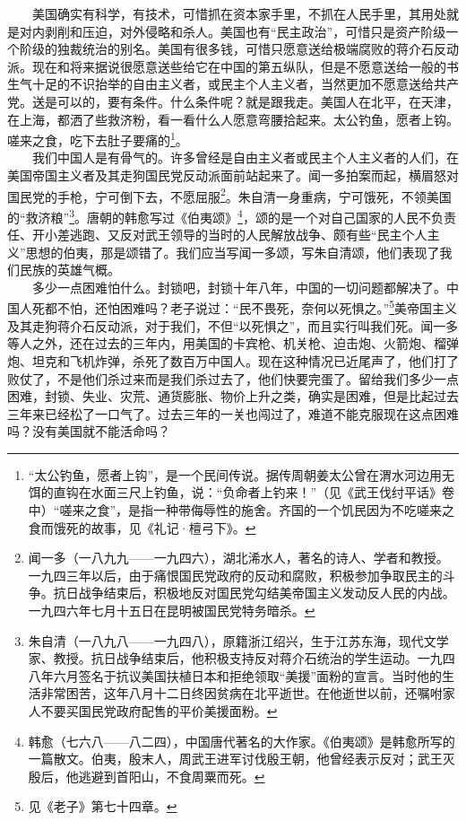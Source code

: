 \documentclass[cn,11pt,chinese]{elegantbook}
\begin{document}
　　美国确实有科学，有技术，可惜抓在资本家手里，不抓在人民手里，其用处就是对内剥削和压迫，对外侵略和杀人。美国也有“民主政治”，可惜只是资产阶级一个阶级的独裁统治的别名。美国有很多钱，可惜只愿意送给极端腐败的蒋介石反动派。现在和将来据说很愿意送些给它在中国的第五纵队，但是不愿意送给一般的书生气十足的不识抬举的自由主义者，或民主个人主义者，当然更加不愿意送给共产党。送是可以的，要有条件。什么条件呢？就是跟我走。美国人在北平，在天津，在上海，都洒了些救济粉，看一看什么人愿意弯腰拾起来。太公钓鱼，愿者上钩。嗟来之食，吃下去肚子要痛的\footnote[6]{ “太公钓鱼，愿者上钩”，是一个民间传说。据传周朝姜太公曾在渭水河边用无饵的直钩在水面三尺上钓鱼，说：“负命者上钓来！”（见《武王伐纣平话》卷中）“嗟来之食”，是指一种带侮辱性的施舍。齐国的一个饥民因为不吃嗟来之食而饿死的故事，见《礼记·檀弓下》。}。\\
　　我们中国人是有骨气的。许多曾经是自由主义者或民主个人主义者的人们，在美国帝国主义者及其走狗国民党反动派面前站起来了。闻一多拍案而起，横眉怒对国民党的手枪，宁可倒下去，不愿屈服\footnote[7]{ 闻一多（一八九九——一九四六），湖北浠水人，著名的诗人、学者和教授。一九四三年以后，由于痛恨国民党政府的反动和腐败，积极参加争取民主的斗争。抗日战争结束后，积极地反对国民党勾结美帝国主义发动反人民的内战。一九四六年七月十五日在昆明被国民党特务暗杀。}。朱自清一身重病，宁可饿死，不领美国的“救济粮”\footnote[8]{ 朱自清（一八九八——一九四八），原籍浙江绍兴，生于江苏东海，现代文学家、教授。抗日战争结束后，他积极支持反对蒋介石统治的学生运动。一九四八年六月签名于抗议美国扶植日本和拒绝领取“美援”面粉的宣言。当时他的生活非常困苦，这年八月十二日终因贫病在北平逝世。在他逝世以前，还嘱咐家人不要买国民党政府配售的平价美援面粉。}。唐朝的韩愈写过《伯夷颂》\footnote[9]{ 韩愈（七六八——八二四），中国唐代著名的大作家。《伯夷颂》是韩愈所写的一篇散文。伯夷，殷末人，周武王进军讨伐殷王朝，他曾经表示反对；武王灭殷后，他逃避到首阳山，不食周粟而死。}，颂的是一个对自己国家的人民不负责任、开小差逃跑、又反对武王领导的当时的人民解放战争、颇有些“民主个人主义”思想的伯夷，那是颂错了。我们应当写闻一多颂，写朱自清颂，他们表现了我们民族的英雄气概。\\
　　多少一点困难怕什么。封锁吧，封锁十年八年，中国的一切问题都解决了。中国人死都不怕，还怕困难吗？老子说过：“民不畏死，奈何以死惧之。”\footnote[10]{ 见《老子》第七十四章。}美帝国主义及其走狗蒋介石反动派，对于我们，不但“以死惧之”，而且实行叫我们死。闻一多等人之外，还在过去的三年内，用美国的卡宾枪、机关枪、迫击炮、火箭炮、榴弹炮、坦克和飞机炸弹，杀死了数百万中国人。现在这种情况已近尾声了，他们打了败仗了，不是他们杀过来而是我们杀过去了，他们快要完蛋了。留给我们多少一点困难，封锁、失业、灾荒、通货膨胀、物价上升之类，确实是困难，但是比起过去三年来已经松了一口气了。过去三年的一关也闯过了，难道不能克服现在这点困难吗？没有美国就不能活命吗？\\
\end{document}
